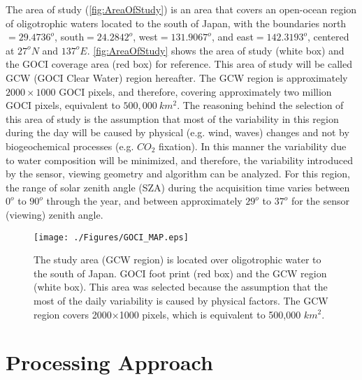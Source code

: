\documentclass[onecolumn,3p,letterpaper,11pt]{elsarticle}
\begin{document}
The area of study (\autoref{fig:AreaOfStudy}) is an area that covers an open-ocean region of oligotrophic waters located to the south of Japan, with the boundaries north$=29.4736^o$, south$=24.2842^o$, west$=131.9067^o$, and east$=142.3193^o$, centered at $27^oN$ and $137^oE$. \autoref{fig:AreaOfStudy} shows the area of study (white box) and the GOCI coverage area (red box) for reference. This area of study will be called GCW (GOCI Clear Water) region hereafter. The GCW region is approximately $2000\times 1000$ GOCI pixels, and therefore, covering approximately two million GOCI pixels, equivalent to $500,000\ km^2$. The reasoning behind the selection of this area of study is the assumption that most of the variability in this region during the day will be caused by physical (e.g. wind, waves) changes and not by biogeochemical processes (e.g. $CO_2$ fixation). In this manner the variability due to water composition will be minimized, and therefore, the variability introduced by the sensor, viewing geometry and algorithm can be analyzed. For this region, the range of solar zenith angle (SZA) during the acquisition time  varies between $0^o$ to $90^o$ through the year, and between approximately $29^o$ to $37^o$ for the sensor (viewing) zenith angle.

\begin{figure}[ht]
\centering
\texttt{[image: ./Figures/GOCI\_MAP.eps]}
  \caption{The study area (GCW region) is located over oligotrophic water to the south of Japan. GOCI foot print (red box) and the GCW region (white box). This area was selected because the assumption that the most of the daily variability is caused by physical factors. The GCW region covers 2000$\times$1000 pixels, which is equivalent to 500,000 $km^2$.}
	\label{fig:AreaOfStudy}
\end{figure}
\section{Processing Approach}
\label{sec:processing}
\end{document}
